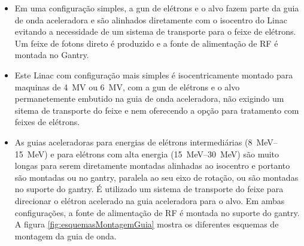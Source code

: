 \documentclass[11pt,a4paper]{article}
\begin{document}
            \begin{itemize}
                \item Em uma configuração simples, a gun de elétrons e o alvo fazem parte da guia de onda aceleradora e são alinhados diretamente com o isocentro do Linac evitando a necessidade de um sistema de transporte para o feixe de elétrons. Um feixe de fotons direto é produzido e a fonte de alimentação de RF é montada no Gantry.
                
                \item Este Linac com configuração mais simples é isocentricamente montado para maquinas de \qty{4}{MV} ou \qty{6}{MV}, com a gun de elétrons e o alvo permanetemente embutido na guia de onda aceleradora, não exigindo um sitema de transporte do feixe e nem oferecendo a opção para tratamento com feixes de elétrons.
                
                \item As guias aceleradoras para energias de elétrons intermediárias (\qtyrange{8}{15}{MeV}) e para elétrons com alta energia (\qtyrange{15}{30}{MeV}) são muito longas para serem diretamente montadas alinhadas ao isocentro e portanto são montadas ou no gantry, paralela ao seu eixo de rotação, ou são montadas no suporte do gantry. É utilizado um sistema de transporte do feixe para direcionar o elétron acelerado na guia aceleradora para o alvo. Em ambas configurações, a fonte de alimentação de RF é montada no suporte do gantry. A figura \ref{fig:esquemasMontagemGuia} mostra os diferentes esquemas de montagem da guia de onda.
            \end{itemize}
             
\end{document}
